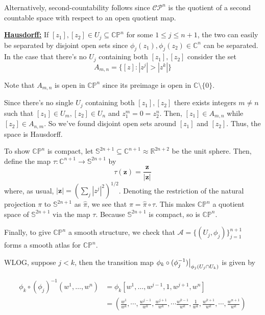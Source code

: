\documentclass{article}
\newcommand{\R}{\mathbb{R}}
\newcommand{\C}{\mathbb{C}}
\newcommand{\restr}[2]{{%
  \left.\kern-\nulldelimiterspace %
  #1 %
  \vphantom{\big|} %
  \right|_{#2} %
  }}
\begin{document}
\vskip 0.5cm
Alternatively, second-countability follows since $\mathcal{CP}^n$ is the quotient of a second countable space with respect to an open quotient map.

\vskip 1cm
\underline{\textbf{Hausdorff:}}
If $[z_1], [z_2] \in U_j \subseteq \mathbb{CP}^n$ for some $1 \leq j \leq n+1$, the two can easily be separated by disjoint open sets since $\phi_j(z_1), \phi_j(z_2) \in \mathbb{C}^{n}$ can be separated. In the case that there's no $U_j$ containing both $[z_1], [z_2]$ consider the set 
\[ A_{m, n} = \{ [z] : |z^j| > |z^k| \} \]

\vskip 0.25cm
Note that $A_{m,n}$ is open in $\mathbb{CP}^n$ since its preimage is open in $\C \setminus \{0\}$.

\vskip 0.25cm
Since there's no single $U_j$ containing both $[z_1], [z_2]$ there exists integers $m \neq n$ such that $[z_1] \in U_m, [z_2] \in U_n$ and $z_1^{m} = 0 = z_2^{n}$. Then, $[z_1] \in A_{m, n}$ while $[z_2] \in A_{n, m}$. So we've found disjoint open sets around $[z_1]$ and $[z_2]$. Thus, the space is Hausdorff.

\vskip 0.5cm
To show $\mathbb{CP}^n$ is compact, let $\mathbb{S}^{2n+1} \subseteq \C^{n+1} \approx \R^{2n+2}$ be the unit sphere. Then, define the map $\tau : \mathbb{C}^{n+1} \rightarrow \mathbb{S}^{2n+1}$ by 
\[ \tau(\mathbf{z}) = \frac{\mathbf{z}}{|\mathbf{z}|} \]
where, as usual, $|\mathbf{z}| = \left( \sum_j |z^j|^2 \right)^{1/2}$. Denoting the restriction of the natural projection $\pi$ to $\mathbb{S}^{2n+1}$ as $\hat{\pi}$, we see that $\pi = \hat{\pi} \circ \tau$. This makes $\mathbb{CP}^n$ a quotient space of $\mathbb{S}^{2n+1}$ via the map $\tau$. Because $\mathbb{S}^{2n+1}$ is compact, so is $\mathbb{CP}^n$.

\vskip 0.5cm
Finally, to give $\mathbb{CP}^n$ a smooth structure, we check that $\mathcal{A} = \{ (U_j, \phi_j) \}_{j = 1}^{n+1}$ forms a smooth atlas for $\mathbb{CP}^n$.

\vskip 0.25cm
WLOG, suppose $j < k$, then the transition map $\restr{\phi_k \circ (\phi_j^{-1})}{\phi_j(U_j \cap U_k)}$ is given by 

\begin{align*}
  \phi_k \circ (\phi_j)^{-1}(w^1, \dots, w^n) &= \phi_k \left[ w^1, \dots, w^{j-1}, 1, w^{j+1}, w^{n} \right] \\
  &= \left( \frac{w^1}{w^k}, \cdots, \frac{w^{j-1}}{w^k}, \frac{w^{j+1}}{w^k}, \cdots \frac{w^{k-1}}{w^k}, \frac{1}{w^k}, \frac{w^{k+1}}{w^k}, \cdots, \frac{w^{n+1}}{w^k}  \right)
\end{align*}
\end{document}
